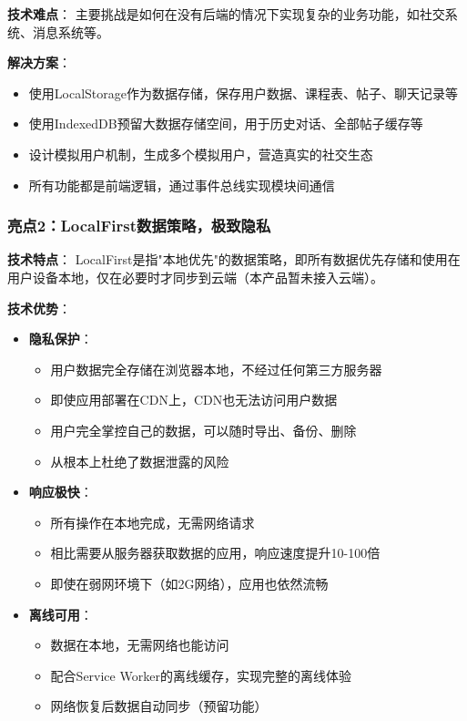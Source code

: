 \documentclass[12pt,a4paper]{article}
\begin{document}
\textbf{技术难点}：
主要挑战是如何在没有后端的情况下实现复杂的业务功能，如社交系统、消息系统等。

\textbf{解决方案}：
\begin{itemize}
    \item 使用LocalStorage作为数据存储，保存用户数据、课程表、帖子、聊天记录等
    \item 使用IndexedDB预留大数据存储空间，用于历史对话、全部帖子缓存等
    \item 设计模拟用户机制，生成多个模拟用户，营造真实的社交生态
    \item 所有功能都是前端逻辑，通过事件总线实现模块间通信
\end{itemize}

\subsubsection{亮点2：LocalFirst数据策略，极致隐私}

\textbf{技术特点}：
LocalFirst是指"本地优先"的数据策略，即所有数据优先存储和使用在用户设备本地，仅在必要时才同步到云端（本产品暂未接入云端）。

\textbf{技术优势}：
\begin{itemize}
    \item \textbf{隐私保护}：
        \begin{itemize}
            \item 用户数据完全存储在浏览器本地，不经过任何第三方服务器
            \item 即使应用部署在CDN上，CDN也无法访问用户数据
            \item 用户完全掌控自己的数据，可以随时导出、备份、删除
            \item 从根本上杜绝了数据泄露的风险
        \end{itemize}
    \item \textbf{响应极快}：
        \begin{itemize}
            \item 所有操作在本地完成，无需网络请求
            \item 相比需要从服务器获取数据的应用，响应速度提升10-100倍
            \item 即使在弱网环境下（如2G网络），应用也依然流畅
        \end{itemize}
    \item \textbf{离线可用}：
        \begin{itemize}
            \item 数据在本地，无需网络也能访问
            \item 配合Service Worker的离线缓存，实现完整的离线体验
            \item 网络恢复后数据自动同步（预留功能）
        \end{itemize}
\end{itemize}
\end{document}
